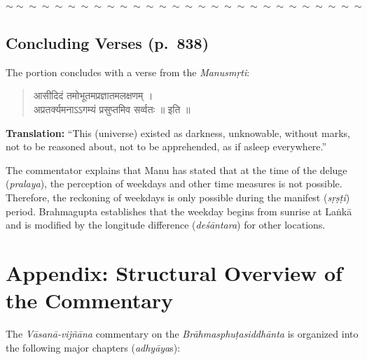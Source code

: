 \documentclass[11pt,a4paper]{article}
\newcommand{\dev}[1]{{\devanagarifont #1}}
\newenvironment{shloka}
  {\begin{verse}\devanagarifont\color{versecolor}}
  {\end{verse}}
\newenvironment{commentary}
  {\small\color{commentarycolor}\par\noindent\ignorespaces}
  {\par}
\newcommand{\wavydivider}{\begin{center}$\sim\sim\sim\sim\sim\sim\sim\sim\sim\sim\sim\sim\sim\sim\sim\sim\sim\sim\sim\sim\sim\sim\sim\sim\sim\sim\sim\sim$\end{center}}
\begin{document}
\wavydivider

\subsection*{Concluding Verses (p.\ 838)}

The portion concludes with a verse from the \textit{Manusmṛti}:

\begin{shloka}
\dev{आसीदिदं तमोभूतमप्रज्ञातमलक्षणम् ।}\\
\dev{अप्रतर्क्यमनाऽऽगम्यं प्रसुप्तमिव सर्व्वतः ॥ इति ॥}
\end{shloka}

\textbf{Translation:} ``This (universe) existed as darkness, unknowable, without marks, not to be reasoned about, not to be apprehended, as if asleep everywhere.''

\begin{commentary}
The commentator explains that Manu has stated that at the time of the deluge (\textit{pralaya}), the perception of weekdays and other time measures is not possible. Therefore, the reckoning of weekdays is only possible during the manifest (\textit{sṛṣṭi}) period. Brahmagupta establishes that the weekday begins from sunrise at Laṅkā and is modified by the longitude difference (\textit{deśāntara}) for other locations.
\end{commentary}

\newpage

\section*{Appendix: Structural Overview of the Commentary}

The \textit{Vāsanā-vijñāna} commentary on the \textit{Brāhmasphuṭasiddhānta} is organized into the following major chapters (\textit{adhyāya}s):
\end{document}
